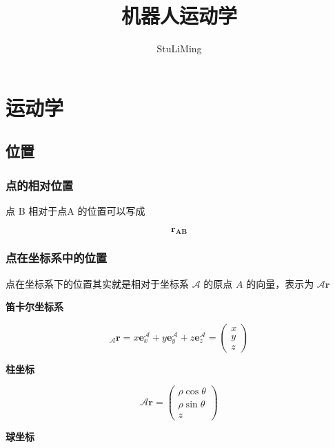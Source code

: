 \documentclass[11pt]{ctexart}
\title{机器人运动学}
\author{StuLiMing}
\date{} %
\begin{document}
\CJKindent                   %
\maketitle                   %

\section{运动学}

\subsection{位置}

\subsubsection{点的相对位置}
点 B 相对于点A 的位置可以写成

\begin{equation}
    \mathbf{r_{AB}}
\end{equation}


\subsubsection{点在坐标系中的位置}
点在坐标系下的位置其实就是相对于坐标系 $\mathcal{A}$ 的原点 $A$ 的向量，表示为 ${\mathcal{A}}\mathbf{r}$

\noindent\textbf{笛卡尔坐标系}

\begin{equation}
    \left._\mathcal{A}\mathbf{r}=x\mathbf{e}_x^\mathcal{A}+y\mathbf{e}_y^\mathcal{A}+z\mathbf{e}_z^\mathcal{A}=\left(\begin{array}{c}x\\y\\z\end{array}\right.\right)
\end{equation}



\noindent\textbf{柱坐标}

\begin{equation}
    \left.\mathcal{A}\mathbf{r}=\left(\begin{array}{c}\rho\cos\theta\\\rho\sin\theta\\z\end{array}\right.\right)
\end{equation}


\noindent\textbf{球坐标}
\end{document}
